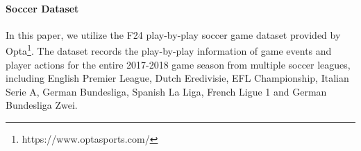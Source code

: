 \documentclass{article}
\begin{document}
\paragraph{Soccer Dataset} In this paper, we utilize the F24 play-by-play soccer game dataset provided by Opta\footnote{https://www.optasports.com/}. The dataset records the play-by-play information of game events and player actions for the entire 2017-2018 game season from multiple soccer leagues, including English Premier League, Dutch Eredivisie, EFL Championship, Italian Serie A, German Bundesliga, Spanish La Liga,  French Ligue 1 and German Bundesliga Zwei.

\end{document}
